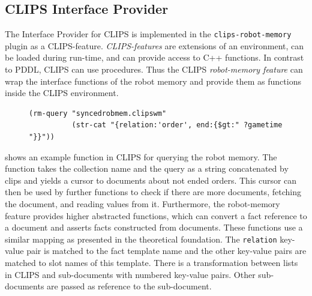\subsection{CLIPS Interface Provider}
\label{sec:impl-clips}
The Interface Provider for CLIPS is implemented in the
\texttt{clips-robot-memory} plugin as a CLIPS-feature. \emph{CLIPS-features} are extensions
of an environment, can be loaded during run-time, and can provide
access to C++ functions. In contrast to PDDL, CLIPS can use procedures. Thus
the CLIPS \emph{robot-memory feature} can wrap the interface functions
of the robot memory and provide them as functions inside the CLIPS
environment.
\begin{figure}
  \begin{lstlisting}[showlines,style=ReallySmallCLIPS, caption={CLIPS function to execute a query},
  label=lst:clips-rm,
  emph={skill, args, state, target, res},
  emphstyle=\bfseries\color{green!80!black},
  emph={[2]\?skill, \$\?args, wait-for-lock, \?target, use,
  WAIT-FOR-LOCK, SKILL-EXECUTION, running},
  emphstyle={[2]\bfseries\color{blue!80!black}},
  morekeywords={retract, assert, modify, skill-call, skill-to-execute,
    wait-for-lock}]
(rm-query "syncedrobmem.clipswm"
          (str-cat "{relation:'order', end:{$gt:" ?gametime "}}"))
\end{lstlisting} %
\end{figure}
 shows an example function in CLIPS for querying
the robot memory. The function takes the collection name and the query
as a string concatenated by clips and yields a cursor to documents
about not ended orders. This cursor can then be used by further
functions to check if there are more documents, fetching the document,
and reading values from it. Furthermore, the robot-memory feature
provides higher abstracted functions, which can convert a fact
reference to a document and asserts facts constructed from
documents. These functions use a similar mapping as presented in the
theoretical foundation. The \texttt{relation} key-value pair is
matched to the fact template name and the other key-value pairs are
matched to slot names of this template. There is a transformation
between lists in CLIPS and sub-documents with numbered key-value
pairs. Other sub-documents are passed as reference to the
sub-document. 

